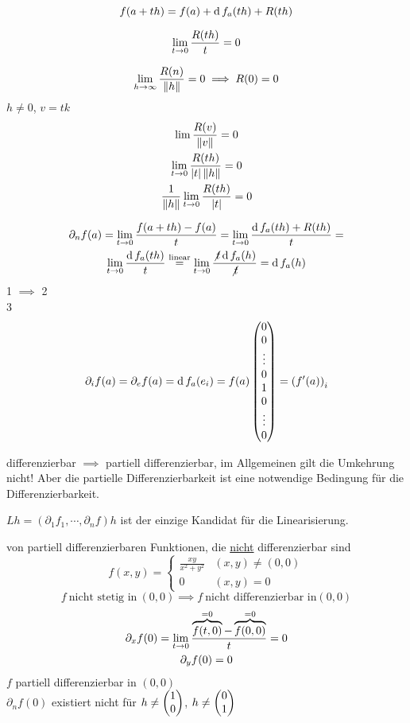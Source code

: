 \begin{Bew}
  \[f(a+th)=f(a)+\operatorname{d} f_a(th)+R(th)\]
  \begin{Lem}
    \[\displaystyle\lim_{t\rightarrow0}\frac{R(th)}{t}=0\]
  \end{Lem}
  \begin{Bew}
    \[\displaystyle\lim_{h\rightarrow\infty}\frac{R(n)}{\left\| h \right\|}=0\implies R(0)=0\]
    $h\neq 0$, $v=tk$
    \begin{gather*}
      \lim\frac{R(v)}{\left\| v \right\|}=0\\
      \displaystyle\lim_{t\rightarrow0}\frac{R(th)}{\left| t \right|\left\| h \right\|}=0\\
      \frac{1}{\left\| h \right\|}\displaystyle\lim_{t\rightarrow0}\frac{R(th)}{\left| t \right|}=0
    \end{gather*}
  \end{Bew}
  \begin{gather*}
    \partial_nf(a)=\displaystyle\lim_{t\rightarrow0}\frac{f(a+th)-f(a)}{t}=\displaystyle\lim_{t\rightarrow0}\frac{\operatorname{d} f_a(th)+R(th)}{t}=\\
    \displaystyle\lim_{t\rightarrow0}\frac{\operatorname{d} f_a(th)}{t}\stackrel{\text{linear}}{=}\displaystyle\lim_{t\rightarrow0}\frac{\not t \operatorname{d} f_a(h)}{\not t}=\operatorname{d} f_a(h)
  \end{gather*}
  1 $\implies$ 2\\
  3
  \begin{gather*}
    \partial_if(a)=\partial_ef(a)=\operatorname{d} f_a(e_i)=f(a)\begin{pmatrix}0\\0\\\vdots\\0\\1\\0\\\vdots\\0\end{pmatrix}=\left( f'(a) \right)_i
  \end{gather*}
\end{Bew}
\begin{Bem}
  differenzierbar $\implies$ partiell differenzierbar, im Allgemeinen gilt die Umkehrung nicht! Aber die partielle Differenzierbarkeit ist eine notwendige Bedingung für die Differenzierbarkeit.
\end{Bem}
\begin{Bem}
  $Lh=\left( \partial_1f_1,\cdots,\partial_nf \right)h$ ist der einzige Kandidat für die Linearisierung.
\end{Bem}
\begin{Bsp}
  von partiell differenzierbaren Funktionen, die \underline{nicht} differenzierbar sind
  \[f(x,y)=\begin{cases}
    \frac{xy}{x^2+y^2}&(x,y)\neq (0,0)\\
    0&(x,y)=0
  \end{cases}\]
  \[f\ \text{nicht stetig in}\ (0,0)\implies f\ \text{nicht differenzierbar in} (0,0)\]
  \begin{gather*}
    \partial_xf(0)=\displaystyle\lim_{t\rightarrow0}\frac{\overbrace{f(t,0)}^{=0}-\overbrace{f(0,0)}^{=0}}{t}=0\\
    \partial_yf(0)=0
  \end{gather*}
  $f$ partiell differenzierbar in $(0,0)$\\
  $\partial_nf(0)$ existiert nicht für $h\neq\begin{pmatrix}1\\0\end{pmatrix}$, $h\neq\begin{pmatrix}0\\1\end{pmatrix}$
\end{Bsp}


